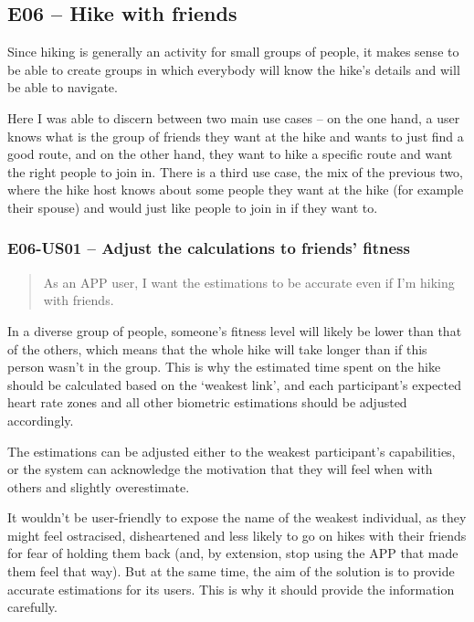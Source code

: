 
\subsection*{E06 -- Hike with friends}

Since hiking is generally an activity for small groups of people, it makes sense to be able to create groups in which everybody will know the hike's details and will be able to navigate.

Here I was able to discern between two main use cases -- on the one hand, a user knows what is the group of friends they want at the hike and wants to just find a good route,
and on the other hand, they want to hike a specific route and want the right people to join in.
There is a third use case, the mix of the previous two, where the hike host knows about some people they want at the hike (for example their spouse) and would just like people to join in if they want to.

\subsubsection*{E06-US01 -- Adjust the calculations to friends' fitness}
\begin{quote}
As an APP user, I want the estimations to be accurate even if I'm hiking with friends.
\end{quote}

In a diverse group of people, someone's fitness level will likely be lower than that of the others, which means that the whole hike will take longer than if this person wasn't in the group.
This is why the estimated time spent on the hike should be calculated based on the `weakest link', and each participant's expected heart rate zones and all other biometric estimations should be adjusted accordingly.

The estimations can be adjusted either to the weakest participant's capabilities, or the system can acknowledge the motivation that they will feel when with others and slightly overestimate.

It wouldn't be user-friendly to expose the name of the weakest individual, as they might feel ostracised, disheartened and less likely to go on hikes with their friends for fear of holding them back
(and, by extension, stop using the APP that made them feel that way).
But at the same time, the aim of the solution is to provide accurate estimations for its users.
This is why it should provide the information carefully.

